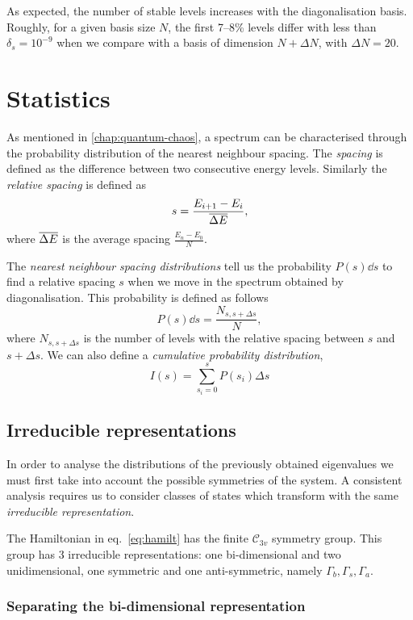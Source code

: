 \documentclass[../thesis.tex]{subfiles}
\begin{document}
As expected, the number of stable levels increases with the
diagonalisation basis.
Roughly, for a given basis size $N$, the first 7--8\% levels differ with less
than \({\delta_s = 10^{-9}}\) when we compare with a basis of dimension
\(N + \Delta N\), with \(\Delta N = 20\).

\section{Statistics}

As mentioned in \cref{chap:quantum-chaos}, a spectrum can be characterised through the
probability distribution of the nearest neighbour spacing.
The \emph{spacing} is defined as the difference between two consecutive
energy levels. Similarly the \emph{relative spacing} is defined as
\[
  s = \frac{E_{i+1} - E_i}{\overline{\Delta E}},
\]
where \(\overline{\Delta E}\) is the average spacing \(\frac{E_n - E_0}{N}\).

The \emph{nearest neighbour spacing distributions} tell us the probability \(P(s)\dd{s}\) to
find a relative spacing $s$ when we move in the spectrum obtained by diagonalisation.
This probability is defined as follows
\[
  P(s)\dd{s} = \frac{N_{s,s+\Delta s}}{N},
\]
where \(N_{s,s+\Delta s}\) is the number of levels with the relative spacing
between \(s\) and \(s+ \Delta s\).
We can also define a \emph{cumulative probability distribution},
\[
  I(s) = \sum_{s_i=0}^s P(s_i) \Delta s
\]

\subsection{Irreducible representations}

In order to analyse the distributions of the previously obtained eigenvalues
we must first take into account the possible symmetries of the system.
A consistent analysis requires us to consider classes of states which transform
with the same \emph{irreducible representation}.

The Hamiltonian in eq.~\eqref{eq:hamilt} has the finite \(\mathcal{C}_{3v}\)
symmetry group.
This group has 3 irreducible representations: one bi-dimensional and
two unidimensional, one symmetric and one anti-symmetric, namely
\(\Gamma_b, \Gamma_s, \Gamma_a\).

\subsubsection{Separating the bi-dimensional representation}
\end{document}
